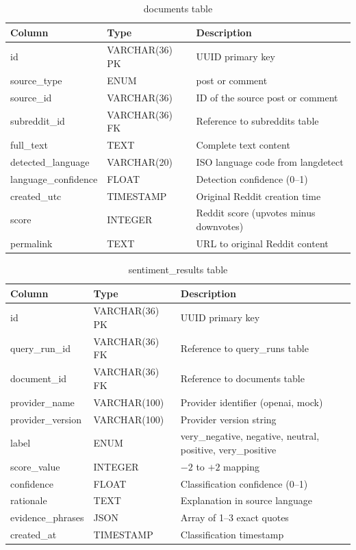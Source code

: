 \begin{table}[H]
\centering
\caption{documents table}
\label{tab:schema_documents}
\small
\begin{tabularx}{\textwidth}{ll>{\raggedright\arraybackslash}X}
\toprule
\textbf{Column} & \textbf{Type} & \textbf{Description} \\
\midrule
id & VARCHAR(36) PK & UUID primary key \\
source\_type & ENUM & post or comment \\
source\_id & VARCHAR(36) & ID of the source post or comment \\
subreddit\_id & VARCHAR(36) FK & Reference to subreddits table \\
full\_text & TEXT & Complete text content \\
detected\_language & VARCHAR(20) & ISO language code from langdetect \\
language\_confidence & FLOAT & Detection confidence (0--1) \\
created\_utc & TIMESTAMP & Original Reddit creation time \\
score & INTEGER & Reddit score (upvotes minus downvotes) \\
permalink & TEXT & URL to original Reddit content \\
\bottomrule
\end{tabularx}
\end{table}

\begin{table}[H]
\centering
\caption{sentiment\_results table}
\label{tab:schema_sentiment}
\small
\begin{tabularx}{\textwidth}{ll>{\raggedright\arraybackslash}X}
\toprule
\textbf{Column} & \textbf{Type} & \textbf{Description} \\
\midrule
id & VARCHAR(36) PK & UUID primary key \\
query\_run\_id & VARCHAR(36) FK & Reference to query\_runs table \\
document\_id & VARCHAR(36) FK & Reference to documents table \\
provider\_name & VARCHAR(100) & Provider identifier (openai, mock) \\
provider\_version & VARCHAR(100) & Provider version string \\
label & ENUM & very\_negative, negative, neutral, positive, very\_positive \\
score\_value & INTEGER & $-2$ to $+2$ mapping \\
confidence & FLOAT & Classification confidence (0--1) \\
rationale & TEXT & Explanation in source language \\
evidence\_phrases & JSON & Array of 1--3 exact quotes \\
created\_at & TIMESTAMP & Classification timestamp \\
\bottomrule
\end{tabularx}
\end{table}


